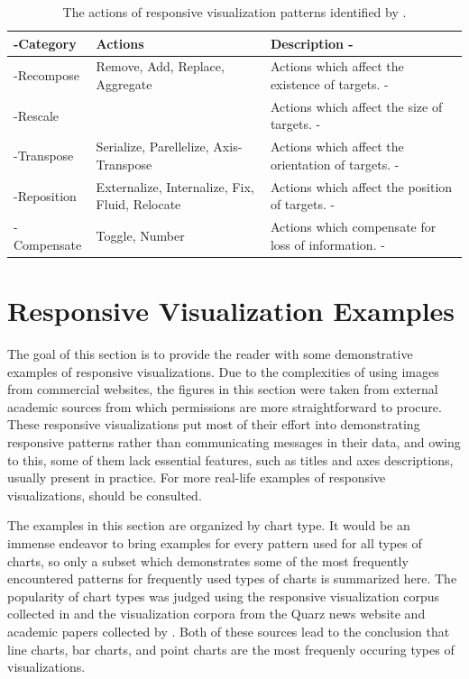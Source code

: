 \begin{table}[tp]
\tablestretch
{}
\centering
\begin{tabularx}{\linewidth}{>{\kern-\tabcolsep}l>{\raggedright}p{}X<{\kern-\tabcolsep}}
\toprule
Category & Actions & Description \\
\midrule
Recompose & Remove, Add, Replace, Aggregate & Actions which affect the existence of targets. \\
Rescale &  & Actions which affect the size of targets. \\
Transpose & Serialize, Parellelize, Axis-Transpose & Actions which affect the orientation of targets. \\
Reposition & Externalize, Internalize, Fix, Fluid, Relocate & Actions which affect the position of targets. \\
Compensate & Toggle, Number & Actions which compensate for loss of information. \\
\bottomrule
\end{tabularx}
\caption[Actions of Responsive Visualization Patterns]{%
The actions of responsive visualization patterns identified by
\textcite{DesignPatternsTradeOffsRespVis}.
}
\label{tab:PatternsActions}
\end{table}



\section{Responsive Visualization Examples}

The goal of this section is to provide the reader with some
demonstrative examples of responsive visualizations. Due to the
complexities of using images from commercial websites, the figures in
this section were taken from external academic sources from which
permissions are more straightforward to procure. These responsive
visualizations put most of their effort into demonstrating responsive
patterns rather than communicating messages in their data, and owing
to this, some of them lack essential features, such as titles and axes
descriptions, usually present in practice. For more real-life examples
of responsive visualizations,
\textcite{DesignPatternsTradeOffsRespVisGallery} should be consulted. 

The examples in this section are organized by chart type. It would be
an immense endeavor to bring examples for every pattern used for all
types of charts, so only a subset which demonstrates some of the most
frequently encountered patterns for frequently used types of charts is
summarized here. The popularity of chart types was judged using the
responsive visualization corpus collected in
\textcite{DesignPatternsTradeOffsRespVisGallery} and the visualization
corpora from the Quarz news website and academic papers collected by
\textcite{ReverseEngineeringVisualizations}. Both of these sources
lead to the conclusion that line charts, bar charts, and point charts
are the most frequenly occuring types of visualizations.





